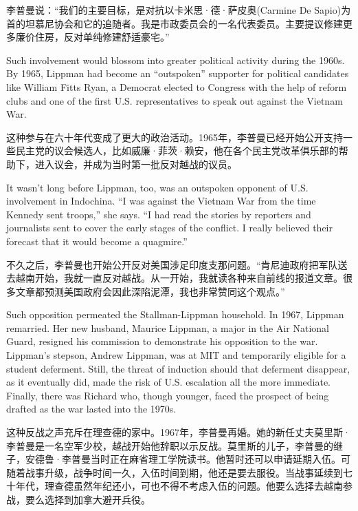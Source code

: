 \ifdefined\chs
李普曼说：``我们的主要目标，是对抗以卡米思·德·萨皮奥(Carmine De Sapio)为首的坦慕尼协会和它的追随者。我是市政委员会的一名代表委员。主要提议修建更多廉价住房，反对单纯修建舒适豪宅。''
\fi

\ifdefined\eng
Such involvement would blossom into greater political activity during the 1960s. By 1965, Lippman had become an ``outspoken'' supporter for political candidates like William Fitts Ryan, a Democrat elected to Congress with the help of reform clubs and one of the first U.S. representatives to speak out against the Vietnam War.
\fi

\ifdefined\chs
这种参与在六十年代变成了更大的政治活动。1965年，李普曼已经开始公开支持一些民主党的议会候选人，比如威廉·菲茨·赖安，他在各个民主党改革俱乐部的帮助下，进入议会，并成为当时第一批反对越战的议员。
\fi

\ifdefined\eng
It wasn't long before Lippman, too, was an outspoken opponent of U.S. involvement in Indochina. ``I was against the Vietnam War from the time Kennedy sent troops,'' she says. ``I had read the stories by reporters and journalists sent to cover the early stages of the conflict. I really believed their forecast that it would become a quagmire.''
\fi

\ifdefined\chs
不久之后，李普曼也开始公开反对美国涉足印度支那问题。``肯尼迪政府把军队送去越南开始，我就一直反对越战。从一开始，我就读各种来自前线的报道文章。很多文章都预测美国政府会因此深陷泥潭，我也非常赞同这个观点。''
\fi

\ifdefined\eng
Such opposition permeated the Stallman-Lippman household. In 1967, Lippman remarried. Her new husband, Maurice Lippman, a major in the Air National Guard, resigned his commission to demonstrate his opposition to the war. Lippman's stepson, Andrew Lippman, was at MIT and temporarily eligible for a student deferment. Still, the threat of induction should that deferment disappear, as it eventually did, made the risk of U.S. escalation all the more immediate. Finally, there was Richard who, though younger, faced the prospect of being drafted as the war lasted into the 1970s.
\fi

\ifdefined\chs
这种反战之声充斥在理查德的家中。1967年，李普曼再婚。她的新任丈夫莫里斯·李普曼是一名空军少校，越战开始他辞职以示反战。莫里斯的儿子，李普曼的继子，安德鲁·李普曼当时正在麻省理工学院读书。他暂时还可以申请延期入伍。可随着战事升级，战争时间一久，入伍时间到期，他还是要去服役。当战事延续到七十年代，理查德虽然年纪还小，可也不得不考虑入伍的问题。他要么选择去越南参战，要么选择到加拿大避开兵役。
\fi

